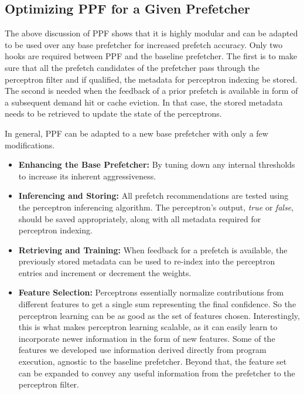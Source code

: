 \subsection{Optimizing PPF for a Given Prefetcher}
\label{Arch-Generalizing}
The above discussion of PPF shows that it is highly modular and can be adapted
to be used over any base prefetcher for increased prefetch accuracy. Only 
two hooks are required between PPF and the baseline prefetcher.
The first is to make sure that all the prefetch candidates of the prefetcher
pass through the perceptron filter and if qualified, the metadata for
perceptron indexing be stored. The second is needed when the feedback of a
prior prefetch is available in form of a subsequent demand hit or cache
eviction. In that case, the stored metadata needs to be retrieved to update
the state of the perceptrons.

In general, PPF can be adapted to a new base prefetcher with only a
few modifications.
\begin{itemize}

\item \textbf{Enhancing the Base Prefetcher:} By tuning down any
  internal thresholds to increase its inherent aggressiveness.

\item \textbf{Inferencing and Storing:} All prefetch recommendations
  are tested using the perceptron inferencing algorithm. The
  perceptron's output, \textit{true} or \textit{false}, should be
  saved appropriately, along with all metadata required for perceptron
  indexing.

\item \textbf{Retrieving and Training:} When feedback for a prefetch
  is available, the previously stored metadata can be used to re-index
  into the perceptron entries and increment or decrement the weights.

\item \textbf{Feature Selection:}  Perceptrons essentially normalize
  contributions from different features to get a single sum representing the
  final confidence. So the perceptron learning can be as good as the set of 
  features chosen. Interestingly, this is what makes perceptron learning 
  scalable, as it can easily learn to incorporate newer information in 
  the form of new features. Some of the features we developed use information 
  derived directly from program execution, agnostic to the baseline 
  prefetcher. Beyond that, the feature set can be expanded to convey 
  any useful information from the prefetcher to the perceptron filter. 
  


\end{itemize}
